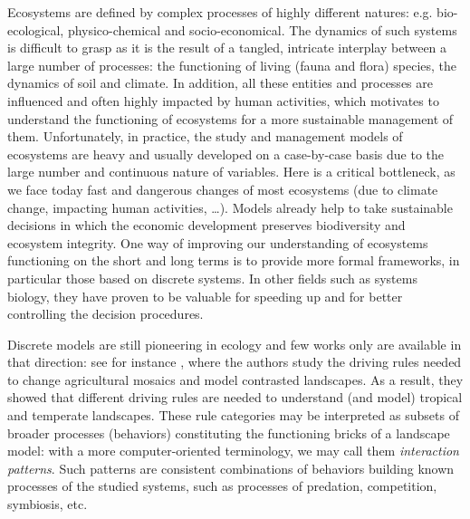 \documentclass[a4paper,twoside]{article}
\begin{document}
Ecosystems are defined by complex processes of highly different natures: e.g. bio-ecological, physico-chemical and socio-economical. 
The dynamics of such systems is difficult to grasp as it is the result of a tangled, intricate interplay between a large number of processes: the functioning of living (fauna and flora) species, the dynamics of soil and climate. %
In addition, all these entities and processes are influenced and often highly impacted by human activities, which motivates to understand the functioning of ecosystems for a more sustainable management of them. %
Unfortunately, in practice, the study and management models of ecosystems are heavy and usually developed on a case-by-case basis due to the large number and continuous nature of variables. %
Here is a critical bottleneck, as we face today fast and dangerous changes of most ecosystems (due to climate change, impacting human activities, \dots). Models already help to take sustainable decisions in which the economic development preserves biodiversity and ecosystem integrity. %
One way of improving our understanding of ecosystems functioning on the short and long terms is to provide more formal frameworks, in particular those based on discrete systems. %
In other fields such as systems biology, they have proven to be valuable for speeding up and for better controlling the decision procedures. %

Discrete models are still pioneering in ecology and few works only are available in that direction: see for instance \cite{gaucherel2012,gaucherel2014}, where the authors study the driving rules needed to change agricultural mosaics and model contrasted landscapes. %
As a result, they showed that different driving rules are needed to understand (and model) tropical and temperate landscapes. %
These rule categories may be interpreted as subsets of broader processes (behaviors) constituting the functioning bricks of a landscape model: with a more computer-oriented terminology, we may call them \emph{interaction patterns}. %
Such patterns are consistent combinations of behaviors building known processes of the studied systems, such as processes of predation, competition, symbiosis, etc. %
\end{document}

